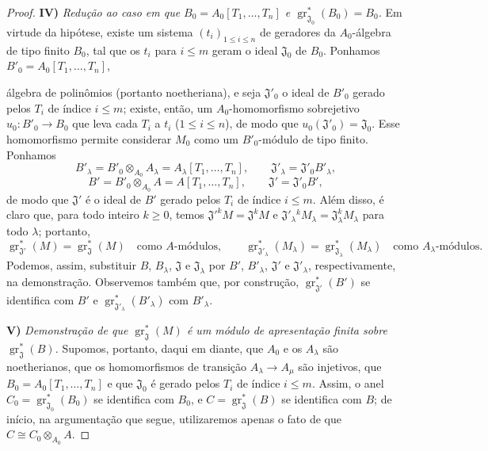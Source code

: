 \begin{proof}
\medskip
\noindent\textbf{IV)} \emph{Redução ao caso em que $B_0=A_0[T_1,\ldots,T_n]$ e $\operatorname{gr}_{\mathfrak J_0}^*(B_0)=B_0$.} Em virtude da hipótese, existe um sistema $(t_i)_{1\leq i\leq n}$ de geradores da $A_0$-álgebra de tipo finito $B_0$, tal que os $t_i$ para $i\leq m$ geram o ideal $\mathfrak J_0$ de $B_0$. Ponhamos $B'_0=A_0[T_1,\ldots,T_n]$,


álgebra de polinômios (portanto noetheriana), e seja $\mathfrak J'_0$ o ideal de $B'_0$ gerado pelos $T_i$ de índice $i\leq m$; existe, então, um $A_0$-homomorfismo sobrejetivo $u_0:B'_0\to B_0$ que leva cada $T_i$ a $t_i$ ($1\leq i\leq n$), de modo que $u_0(\mathfrak J'_0)=\mathfrak J_0$. Esse homomorfismo permite considerar $M_0$ como um $B'_0$-módulo de tipo finito. Ponhamos
\[
B'_\lambda=B'_0\otimes_{A_0}A_\lambda
=A_\lambda[T_1,\ldots,T_n],\qquad
\mathfrak J'_\lambda=\mathfrak J'_0B'_\lambda,
\]
\[
B'=B'_0\otimes_{A_0}A=A[T_1,\ldots,T_n],\qquad
\mathfrak J'=\mathfrak J'_0B',
\]
de modo que $\mathfrak J'$ é o ideal de $B'$ gerado pelos $T_i$ de índice $i\leq m$. Além disso, é claro que, para todo inteiro $k\geq0$, temos $\mathfrak J'^kM=\mathfrak J^kM$ e $\mathfrak J'_\lambda{}^kM_\lambda=\mathfrak J_\lambda^kM_\lambda$ para todo $\lambda$; portanto,
\[
\operatorname{gr}_{\mathfrak J'}^*(M)
=\operatorname{gr}_{\mathfrak J}^*(M)
\quad\text{como $A$-módulos},\qquad
\operatorname{gr}_{\mathfrak J'_\lambda}^*(M_\lambda)
=\operatorname{gr}_{\mathfrak J_\lambda}^*(M_\lambda)
\quad\text{como $A_\lambda$-módulos}.
\]
Podemos, assim, substituir $B$, $B_\lambda$, $\mathfrak J$ e $\mathfrak J_\lambda$ por $B'$, $B'_\lambda$, $\mathfrak J'$ e $\mathfrak J'_\lambda$, respectivamente, na demonstração. Observemos também que, por construção, $\operatorname{gr}_{\mathfrak J'}^*(B')$ se identifica com $B'$ e $\operatorname{gr}_{\mathfrak J'_\lambda}^*(B'_\lambda)$ com $B'_\lambda$.

\medskip
\noindent\textbf{V)} \emph{Demonstração de que $\operatorname{gr}_{\mathfrak J}^*(M)$ é um módulo de apresentação finita sobre $\operatorname{gr}_{\mathfrak J}^*(B)$.} Supomos, portanto, daqui em diante, que $A_0$ e os $A_\lambda$ são noetherianos, que os homomorfismos de transição $A_\lambda\to A_\mu$ são injetivos, que $B_0=A_0[T_1,\ldots,T_n]$ e que $\mathfrak J_0$ é gerado pelos $T_i$ de índice $i\leq m$. Assim, o anel $C_0=\operatorname{gr}_{\mathfrak J_0}^*(B_0)$ se identifica com $B_0$, e $C=\operatorname{gr}_{\mathfrak J}^*(B)$ se identifica com $B$; de início, na argumentação que segue, utilizaremos apenas o fato de que $C\cong C_0\otimes_{A_0}A$.


\end{proof}
